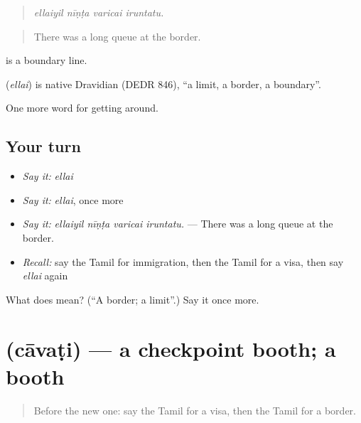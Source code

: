 \begin{quote}
\emph{ellaiyil nīṇṭa varicai iruntatu.}
\end{quote}

\begin{quote}
There was a long queue at the border.
\end{quote}

  is a boundary line.

\begin{cousinweb}
\textbf{} (\emph{ellai}) is native Dravidian (DEDR 846), \textquotedblleft{}a limit, a border, a boundary\textquotedblright{}.
\end{cousinweb}

\begin{grammarlens}[title={What you've built}]
One more word for getting around.
\end{grammarlens}

\subsection*{Your turn}
\begin{itemize}
\raggedright
  \item \emph{Say it:} \emph{ellai}
  \item \emph{Say it:} \emph{ellai}, once more
  \item \emph{Say it:} \emph{ellaiyil nīṇṭa varicai iruntatu.} — There was a long queue at the border.
  \item \emph{Recall:} say the Tamil for immigration, then the Tamil for a visa, then say \emph{ellai} again
\end{itemize}

\begin{tcolorbox}[breakable,colback=teal!4,colframe=teal!35!black,title={Before you move on}]
What does  mean? (\textquotedblleft{}A border; a limit\textquotedblright{}.) Say it once more.
\end{tcolorbox}
\section[\texorpdfstring{\ta{சாவடி} (cāvaṭi)}{சாவடி (cāvaṭi)}]{ (cāvaṭi) — a checkpoint booth; a booth}

\label{lesson:TA-C414-cavati}



\begin{quote}
Before the new one: say the Tamil for a visa, then the Tamil for a border.
\end{quote}

